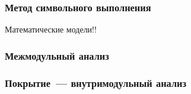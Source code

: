 \documentclass[hyperref={pdfpagelabels=false}]{beamer}
\begin{document}
\begin{frame}
\frametitle{Метод символьного выполнения}
Математические модели!!
\end{frame}

\begin{frame}
\frametitle{Межмодульный анализ}
\begin{figure}[h]
\end{figure}
\end{frame}


\begin{frame}
\frametitle{Покрытие~--- внутримодульный анализ}
\begin{figure}[h]
\end{figure}
\end{frame}
\end{document}
